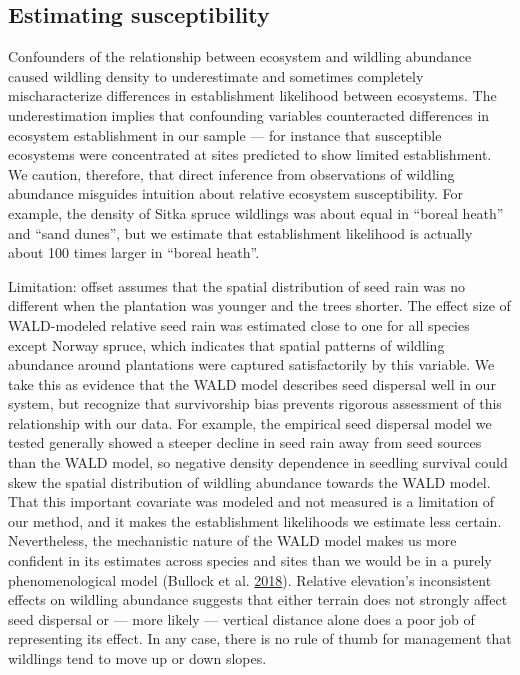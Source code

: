 \documentclass[
]{article}
\begin{document}
\hypertarget{estimating-susceptibility}{%
\subsection{Estimating susceptibility}\label{estimating-susceptibility}}

Confounders of the relationship between ecosystem and wildling abundance caused wildling density to underestimate and sometimes completely mischaracterize differences in establishment likelihood between ecosystems.
The underestimation implies that confounding variables counteracted differences in ecosystem establishment in our sample --- for instance that susceptible ecosystems were concentrated at sites predicted to show limited establishment.
We caution, therefore, that direct inference from observations of wildling abundance misguides intuition about relative ecosystem susceptibility.
For example, the density of Sitka spruce wildlings was about equal in ``boreal heath'' and ``sand dunes'', but we estimate that establishment likelihood is actually about 100 times larger in ``boreal heath''.

Limitation: offset assumes that the spatial distribution of seed rain was no different when the plantation was younger and the trees shorter.
The effect size of WALD-modeled relative seed rain was estimated close to one for all species except Norway spruce, which indicates that spatial patterns of wildling abundance around plantations were captured satisfactorily by this variable.
We take this as evidence that the WALD model describes seed dispersal well in our system, but recognize that survivorship bias prevents rigorous assessment of this relationship with our data.
For example, the empirical seed dispersal model we tested generally showed a steeper decline in seed rain away from seed sources than the WALD model, so negative density dependence in seedling survival could skew the spatial distribution of wildling abundance towards the WALD model.
That this important covariate was modeled and not measured is a limitation of our method, and it makes the establishment likelihoods we estimate less certain.
Nevertheless, the mechanistic nature of the WALD model makes us more confident in its estimates across species and sites than we would be in a purely phenomenological model (Bullock et al. \protect\hyperlink{ref-bullockAllDispersalFunctions2018}{2018}).
Relative elevation's inconsistent effects on wildling abundance suggests that either terrain does not strongly affect seed dispersal or --- more likely --- vertical distance alone does a poor job of representing its effect.
In any case, there is no rule of thumb for management that wildlings tend to move up or down slopes.
\end{document}
